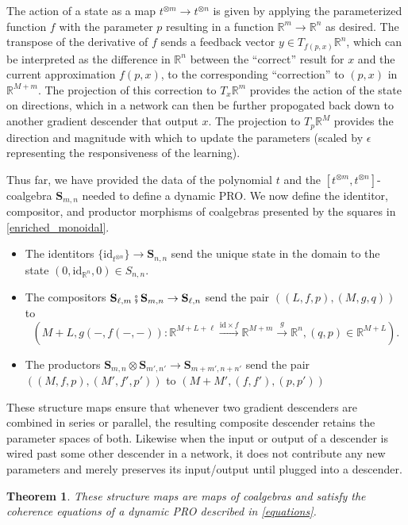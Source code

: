 \documentclass[11pt, one side, article]{memoir}
\theoremstyle{definition}
\theoremstyle{plain}
\newtheorem{theorem}[definitionx]{Theorem}
\newcommand{\Cat}[1]{\mathbf{#1}}%
\newcommand{\id}{\mathrm{id}}
\newcommand{\then}{\mathbin{\fatsemi}}
\newcommand{\To}[2][]{\xrightarrow[#1]{#2}}
\newcommand{\rr}{\mathbb{R}}
\newcommand{\0}{\textsf{0}}
\newcommand{\1}{\tn{\textsf{1}}}
\renewcommand{\S}{{\Cat{S}}}
\newcommand{\idcoalg}[1]{{\{\id_{#1}\}}}
\begin{document}
The action of a state as a map $t^{\otimes m} \to t^{\otimes n}$ is given by applying the parameterized function $f$ with the parameter $p$ resulting in a function $\rr^m \to \rr^n$ as desired. The transpose of the derivative of $f$ sends a feedback vector $y \in T_{f(p,x)} \rr^n$, which can be interpreted as the difference in $\rr^n$ between the ``correct'' result for $x$ and the current approximation $f(p,x)$, to the corresponding ``correction'' to $(p,x)$ in $\rr^{M+m}$. The projection of this correction to $T_x \rr^m$ provides the action of the state on directions, which in a network can then be further propogated back down to another gradient descender that output $x$. The projection to $T_p \rr^M$ provides the direction and magnitude with which to update the parameters (scaled by $\epsilon$ representing the responsiveness of the learning).

Thus far, we have provided the data of the polynomial $t$ and the $[t^{\otimes m},t^{\otimes n}]$-coalgebra $\S_{m,n}$ needed to define a dynamic PRO. We now define the identitor, compositor, and productor morphisms of coalgebras presented by the squares in \cref{enriched_monoidal}.
\begin{itemize}
	\item The identitors $\idcoalg{t^{\otimes n}} \to \S_{n,n}$ send the unique state in the domain to the state $(0,\id_{\rr^n},0) \in S_{n,n}$. 
	\item The compositors $\S_{\ell,m}\then\S_{m,n} \to \S_{\ell,n}$ send the pair $((L,f,p),(M,g,q))$ to 
\[\left( M+L,g(-,f(-,-))\colon \rr^{M+L+\ell} \To{\id \times f} \rr^{M+m} \To{g} \rr^n, (q,p) \in \rr^{M+L} \right).\]
	\item The productors $\S_{m,n} \otimes \S_{m',n'} \to \S_{m+m',n+n'}$ send the pair $((M,f,p),(M',f',p'))$ to $(M+M',(f,f'),(p,p'))$
\end{itemize}

These structure maps ensure that whenever two gradient descenders are combined in series or parallel, the resulting composite descender retains the parameter spaces of both. Likewise when the input or output of a descender is wired past some other descender in a network, it does not contribute any new parameters and merely preserves its input/output until plugged into a descender.

\begin{theorem}\label{gradientadaptive}
These structure maps are maps of coalgebras and satisfy the coherence equations of a dynamic PRO described in \cref{equations}.%
\end{theorem}
\end{document}
